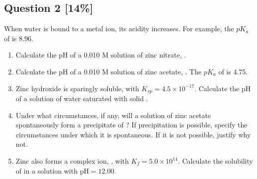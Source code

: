 \documentclass{article}
\begin{document}
\newpage

\subsection*{Question 2 [14\%]}
When water is bound to a metal ion, its acidity increases. For example, the $pK_a$ of  is 8.96.
\begin{enumerate}[label=\alph*.]
    \item Calculate the pH of a 0.010 M solution of zinc nitrate, .
    \vspace{4cm}
    \item Calculate the pH of a 0.010 M solution of zinc acetate, . The $pK_a$ of  is 4.75.
    \vspace{4cm}
    \item Zinc hydroxide is sparingly soluble, with $K_{sp} = 4.5 \times 10^{-17}$. Calculate the pH of a solution of water saturated with solid .
    \vspace{4cm}
    \item Under what circumstances, if any, will a solution of zinc acetate spontaneously form a precipitate of ? If precipitation is possible, specify the circumstances under which it is spontaneous. If it is not possible, justify why not.
    \vspace{4cm}
    \item Zinc also forms a complex ion, , with $K_f = 5.0 \times 10^{14}$. Calculate the solubility of  in a solution with $\text{pH} = 12.00$.
    \vspace{4cm}
\end{enumerate}

\newpage
\end{document}
